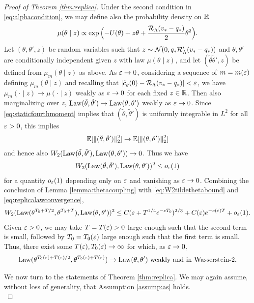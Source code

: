 \begin{proof}[Proof of Theorem \ref{thm:replica}]
Under the second condition in \eqref{eq:alphacondition}, we may define also
the probability density on $\mathbb{R}$
\[\mu(\theta \mid z) \propto
\exp\Big({-}U(\theta)+z\theta+\frac{\mathcal{R}_\Lambda(v_*-q_*)}{2}\theta^2\Big).\]
Let $(\theta,\theta',z)$ be random variables such that $z \sim
\mathcal{N}(0,q_*\mathcal{R}_\Lambda'(v_*-q_*))$ and $\theta,\theta'$ are conditionally
independent given $z$ with law $\mu(\theta \mid z)$, and let
$(\tilde\theta \tilde\theta',z)$ be defined from $\mu_m(\theta \mid z)$
as above. As $\varepsilon \to 0$,
considering a sequence of $m=m(\varepsilon)$ defining $\mu_m(\theta \mid z)$
and recalling that $|\tilde c_g(0)-\mathcal{R}_\Lambda(v_*-q_*)|<\varepsilon$,
we have $\mu_m(\cdot \mid z) \to \mu(\cdot \mid z)$ weakly as $\varepsilon \to 0$
for each fixed $z \in \mathbb{R}$. Then also marginalizing over $z$,
$\operatorname{Law}(\tilde\theta,\tilde\theta') \to \operatorname{Law}(\theta,\theta')$ weakly as
$\varepsilon \to 0$. Since \eqref{eq:staticfourthmoment} implies that
$(\tilde\theta,\tilde\theta')$ is uniformly integrable in $L^2$ for all
$\varepsilon>0$, this implies
\[\mathbb{E}[\|(\tilde\theta,\tilde\theta')\|_2^2] \to \mathbb{E}[\|(\theta,\theta')\|_2^2]\]
and hence also $W_2(\operatorname{Law}(\tilde\theta,\tilde\theta'),\operatorname{Law}(\theta,\theta')) \to
0$. Thus we have
\begin{equation}\label{eq:replicalawconvergence}
W_2(\operatorname{Law}(\tilde\theta,\tilde\theta'),\operatorname{Law}(\theta,\theta'))^2
\leq o_\varepsilon(1)
\end{equation}
for a quantity $o_\varepsilon(1)$ depending only on $\varepsilon$ and vanishing
as $\varepsilon \to 0$. Combining the conclusion of Lemma \ref{lemma:thetacoupling}
with \eqref{eq:W2tildethetabound} and \eqref{eq:replicalawconvergence},
\[W_2(\operatorname{Law}(\theta^{T_0+T/2},\theta^{T_0+T}),
\operatorname{Law}(\theta,\theta'))^2
\leq C(\varepsilon+T^{1/4}e^{-cT_0})^{2/3}
+C(\varepsilon)e^{-c(\varepsilon)T}+o_\varepsilon(1).\]
Given $\varepsilon>0$, we may take $T=T(\varepsilon)>0$ large enough such that the second
term is small, followed by $T_0=T_0(\varepsilon)$ large enough such that the first term
is small. Thus, there exist some $T(\varepsilon),T_0(\varepsilon) \to \infty$ for which,
as $\varepsilon \to 0$,
\begin{equation}\label{eq:finalW2convergence}
\operatorname{Law}(\theta^{T_0(\varepsilon)+T(\varepsilon)/2},\theta^{T_0(\varepsilon)+T(\varepsilon)}) \to 
\operatorname{Law}(\theta,\theta') \text{ weakly and in Wasserstein-2}.
\end{equation}

We now turn to the statements of Theorem \ref{thm:replica}. We may again assume,
without loss of generality, that Assumption \ref{assump:as} holds.\\


\end{proof}
